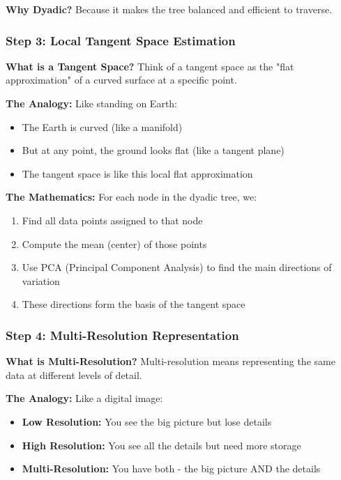 \documentclass[12pt]{article}
\begin{document}
\textbf{Why Dyadic?} Because it makes the tree balanced and efficient to traverse.

\subsubsection{Step 3: Local Tangent Space Estimation}

\textbf{What is a Tangent Space?}
Think of a tangent space as the "flat approximation" of a curved surface at a specific point.

\textbf{The Analogy:} Like standing on Earth:
\begin{itemize}
    \item The Earth is curved (like a manifold)
    \item But at any point, the ground looks flat (like a tangent plane)
    \item The tangent space is like this local flat approximation
\end{itemize}

\textbf{The Mathematics:} For each node in the dyadic tree, we:
\begin{enumerate}
    \item Find all data points assigned to that node
    \item Compute the mean (center) of those points
    \item Use PCA (Principal Component Analysis) to find the main directions of variation
    \item These directions form the basis of the tangent space
\end{enumerate}

\subsubsection{Step 4: Multi-Resolution Representation}

\textbf{What is Multi-Resolution?}
Multi-resolution means representing the same data at different levels of detail.

\textbf{The Analogy:} Like a digital image:
\begin{itemize}
    \item \textbf{Low Resolution:} You see the big picture but lose details
    \item \textbf{High Resolution:} You see all the details but need more storage
    \item \textbf{Multi-Resolution:} You have both - the big picture AND the details
\end{itemize}
\end{document}
